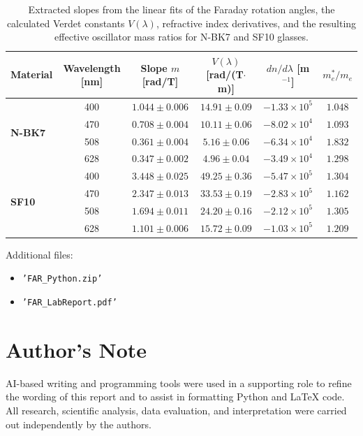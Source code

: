 \documentclass[a4paper]{article}
\renewcommand{\arraystretch}{0.9}
\begin{document}
\begin{table}[H]
  \centering
  \renewcommand{\arraystretch}{1.2}
  \begin{tabular}{l c c c c c}
    \toprule
    \textbf{Material} & \textbf{Wavelength [nm]} & \textbf{Slope $m$ [rad/T]} & \textbf{$V(\lambda)$ [rad/(T$\cdot$m)]} & \textbf{$dn/d\lambda$ [m$^{-1}$]} & \textbf{$m_{e}^*/m_{e}$} \\
    \midrule
    \multirow{4}{*}{\textbf{N-BK7}}
    & 400 & $1.044 \pm 0.006$ & $14.91 \pm 0.09$ & $-1.33 \times 10^5$ & $1.048$ \\
    & 470 & $0.708 \pm 0.004$ & $10.11 \pm 0.06$ & $-8.02 \times 10^4$ & $1.093$ \\
    & 508 & $0.361 \pm 0.004$ & $5.16 \pm 0.06$ & $-6.34 \times 10^4$ & $1.832$ \\
    & 628 & $0.347 \pm 0.002$ & $4.96 \pm 0.04$ & $-3.49 \times 10^4$ & $1.298$ \\
    \midrule
    \multirow{4}{*}{\textbf{SF10}}
    & 400 & $3.448 \pm 0.025$ & $49.25 \pm 0.36$ & $-5.47 \times 10^5$ & $1.304$ \\
    & 470 & $2.347 \pm 0.013$ & $33.53 \pm 0.19$ & $-2.83 \times 10^5$ & $1.162$ \\
    & 508 & $1.694 \pm 0.011$ & $24.20 \pm 0.16$ & $-2.12 \times 10^5$ & $1.305$ \\
    & 628 & $1.101 \pm 0.006$ & $15.72 \pm 0.09$ & $-1.03 \times 10^5$ & $1.209$ \\
    \bottomrule
  \end{tabular}
  \caption{Extracted slopes from the linear fits of the Faraday rotation angles, the calculated Verdet constants $V(\lambda)$, refractive index derivatives, and the resulting effective oscillator mass ratios for N-BK7 and SF10 glasses.}\label{tab:verdet_and_mass}
\end{table}

Additional files:

\begin{itemize}
  \item \texttt{'FAR\_Python.zip'}
  \item \texttt{'FAR\_LabReport.pdf'}
\end{itemize}

\printbibliography[heading=bibintoc]

\section*{Author's Note}
AI-based writing and programming tools were used in a supporting role to refine the wording of this report and to assist in formatting Python and LaTeX code.
All research, scientific analysis, data evaluation, and interpretation were carried out independently by the authors.

\newpage

\end{document}
